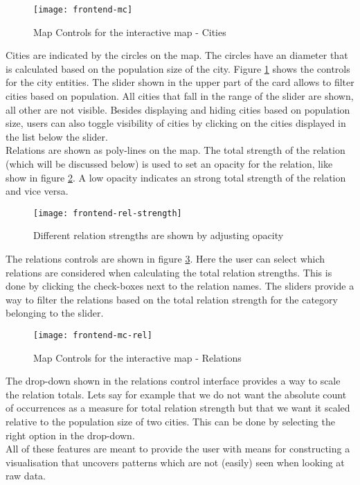 \begin{figure}[H]
\centering
\texttt{[image: frontend-mc]}
\caption{Map Controls for the interactive map - Cities}
\label{fig:frontend-mc}
\end{figure}

Cities are indicated by the circles on the map. The circles have an diameter that is calculated based on the population size of the city. Figure \ref{fig:frontend-mc} shows the controls for the city entities. The slider shown in the upper part of the card allows to filter cities based on population. All cities that fall in the range of the slider are shown, all other are not visible. Besides displaying and hiding cities based on population size, users can also toggle visibility of cities by clicking on the cities displayed in the list below the slider.\\
Relations are shown as poly-lines on the map. The total strength of the relation (which will be discussed below) is used to set an opacity for the relation, like show in figure \ref{fig:frontend-rel-strength}. A low opacity indicates an strong total strength of the relation and vice versa.

\begin{figure}[H]
\centering
\texttt{[image: frontend-rel-strength]}
\caption{Different relation strengths are shown by adjusting opacity}
\label{fig:frontend-rel-strength}
\end{figure}

The relations controls are shown in figure \ref{fig:frontend-mc-rel}. Here the user can select which relations are considered when calculating the total relation strengths. This is done by clicking the check-boxes next to the relation names. The sliders provide a way to filter the relations based on the total relation strength for the category belonging to the slider.\\

\begin{figure}[H]
\centering
\texttt{[image: frontend-mc-rel]}
\caption{Map Controls for the interactive map - Relations}
\label{fig:frontend-mc-rel}
\end{figure}

The drop-down shown in the relations control interface provides a way to scale the relation totals. Lets say for example that we do not want the absolute count of occurrences as a measure for total relation strength but that we want it scaled relative to the population size of two cities. This can be done by selecting the right option in the drop-down.\\
All of these features are meant to provide the user with means for constructing a visualisation that uncovers patterns which are not (easily) seen when looking at raw data.

